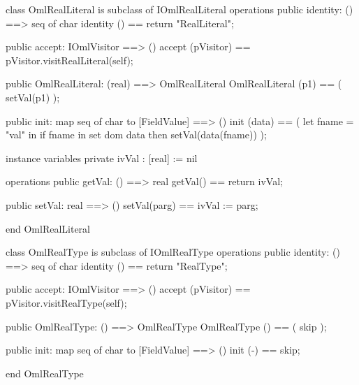 \begin{vdm_al}
class OmlRealLiteral is subclass of IOmlRealLiteral
operations
  public identity: () ==> seq of char
  identity () == return "RealLiteral";

  public accept: IOmlVisitor ==> ()
  accept (pVisitor) == pVisitor.visitRealLiteral(self);

  public OmlRealLiteral:
      (real) ==> OmlRealLiteral
  OmlRealLiteral (p1) == 
   ( setVal(p1) );

  public init: map seq of char to [FieldValue] ==> ()
  init (data) ==
    ( let fname = "val" in
        if fname in set dom data
        then setVal(data(fname)) );

instance variables
  private ivVal : [real] := nil

operations
  public getVal: () ==> real
  getVal() == return ivVal;

  public setVal: real ==> ()
  setVal(parg) == ivVal := parg;

end OmlRealLiteral
\end{vdm_al}

\begin{vdm_al}
class OmlRealType is subclass of IOmlRealType
operations
  public identity: () ==> seq of char
  identity () == return "RealType";

  public accept: IOmlVisitor ==> ()
  accept (pVisitor) == pVisitor.visitRealType(self);

  public OmlRealType:
      () ==> OmlRealType
  OmlRealType () == 
    ( skip );

  public init: map seq of char to [FieldValue] ==> ()
  init (-) == skip;

end OmlRealType
\end{vdm_al}

